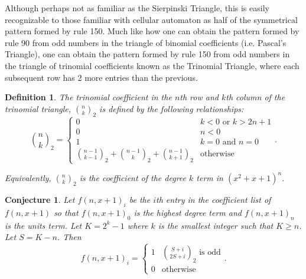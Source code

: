 \documentclass{article}
\newtheorem{conjecture}{Conjecture}
\newtheorem{definition}{Definition}
\begin{document}
	Although perhaps not as familiar as the Sierpinski Triangle, this is easily recognizable to those familiar with cellular automaton as half of the symmetrical pattern formed by rule 150.
	Much like how one can obtain the pattern formed by rule 90 from odd numbers in the triangle of binomial coefficients (i.e. Pascal's Triangle), one can obtain the pattern formed by rule 150 from odd numbers in the triangle of trinomial coefficients known as the Trinomial Triangle, where each subsequent row has 2 more entries than the previous.
	
	\begin{definition}
		The trinomial coefficient in the $n$th row and $k$th column of the trinomial triangle, $\binom{n}{k}_2$ is defined by the following relationships:
		\begin{equation*}
			\binom{n}{k}_2 = \begin{cases}
				0 & k < 0 \text{ or } k > 2n + 1 \\
				0 & n < 0 \\
				1 & k = 0 \text{ and } n = 0 \\
 				\binom{n-1}{k-1}_2 + \binom{n-1}{k}_2 + \binom{n-1}{k+1}_2 & \text{otherwise}
			\end{cases}.
		\end{equation*}
	
		Equivalently, $\binom{n}{k}_2$ is the coefficient of the degree $k$ term in $(x^2 + x + 1)^n$.
	\end{definition}

	\begin{conjecture}
		Let $f(n,x+1)_i$ be the $i$th entry in the coefficient list of $f(n,x+1)$ so that $f(n,x+1)_0$ is the highest degree term and $f(n,x+1)_n$ is the units term.
		Let $K = 2^k - 1$ where $k$ is the smallest integer such that $K \geq n$.
		Let $S = K - n$.
		Then
		\begin{equation*}
			f(n,x+1)_i = \begin{cases}
				1 & \binom{S + i}{2S + i}_2 \text{ is odd} \\
				0 & \text{otherwise}
			\end{cases}.
		\end{equation*}
	\end{conjecture}
	
	
\end{document}
